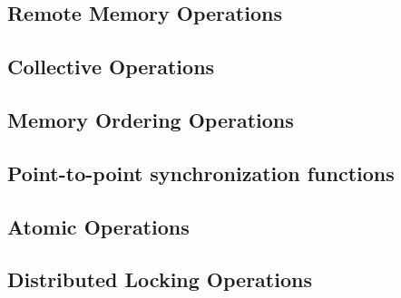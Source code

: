 \documentclass[10pt]{book}
\begin{document}
\subsection{Remote Memory Operations}

\subsection{Collective Operations}

\label{subsec:shmem_barrier}
\label{subsec:shmem_broadcast}
\label{subsec:shmem_reductions}
\subsection{Memory Ordering Operations} %

\subsection{Point-to-point synchronization functions}%
\subsection{Atomic Operations}

\subsection{Distributed Locking Operations}
\end{document}
